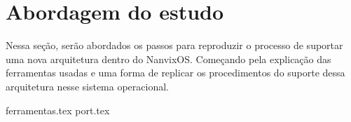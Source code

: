 \section{Abordagem do estudo}

Nessa seção, serão abordados os passos para reproduzir o processo de suportar uma nova arquitetura dentro do NanvixOS. Começando pela 
explicação das ferramentas usadas e uma forma de replicar os procedimentos do suporte dessa arquitetura nesse sistema operacional.

{ferramentas.tex}
{port.tex}
